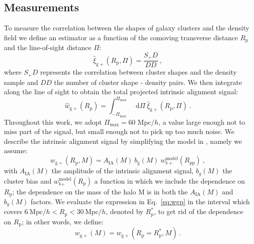 \documentclass[a4paper,fleqn,usenatbib]{mnras}
\newcommand*\dif{\mathop{}\!\mathrm{d}} 	%
\begin{document}
\subsection{Measurements}
\label{subsec:measurements}
To measure the correlation between the shapes of galaxy clusters and the density field we define an estimator as a function of the comoving transverse distance $R_{\mathrm{p}}$ and the line-of-sight distance $\Pi$:
\begin{equation}
    \hat{\xi}_{\mathrm{g+}}(R_{\mathrm{p}}, \Pi) = \frac{S_+ D}{D D} \ ,
	\label{eq:xigphat}
\end{equation}
where $S_+ D$ represents the correlation between cluster shapes and the density sample and $D D$ the number of cluster shape - density pairs. We then integrate along the line of sight to obtain the total projected intrinsic alignment signal:
\begin{equation}
   \hat{w}_{\mathrm{g+}} (R_{\mathrm{p}}) = \int _{-\Pi_{\mathrm{max}}}^{\Pi_{\mathrm{max}}} \dif \Pi \ \hat{\xi}_{\mathrm{g+}}(R_{\mathrm{p}}, \Pi) \ .
	\label{eq:wgphat}
\end{equation}
Throughout this work, we adopt $\Pi_{\mathrm{max}} = 60 $ Mpc$/h$, a value large enough not to miss part of the signal, but small enough not to pick up too much noise. 
We describe the intrinsic alignment signal by simplifying the model in \citet[equation 5]{vanUitertJoachimi2017}, namely we assume:
\begin{equation}
    w_{\mathrm{g+}} (R_{\mathrm{p}}, M)=A_{\mathrm{IA}} (M) \ b_{\mathrm{g}} (M)\ w_{\mathrm{\delta +}}^{\mathrm{model}} (R_{p \mathrm{p}}) \ , 
	\label{eq:wgp}
\end{equation}
with $A_{\mathrm{IA}} (M)$ the amplitude of the intrinsic alignment signal, $b_g (M)$ the cluster bias and $w_{\mathrm{\delta} \mathrm{+}}^{\mathrm{model}} (R_{\mathrm{p}})$ a function in which we include the dependence on $R_{\mathrm{p}}$; the dependence on the mass of the halo M is in both the $A_{\mathrm{IA}} (M)$ and $b_g (M)$ factors. We evaluate the expression in Eq.~\ref{eq:wgp} in the interval which covers $6 \ \mbox{Mpc}/h < R_{\mathrm{p}} < 30 \ \mbox{Mpc}/h$, denoted by $R_{\mathrm{p}}^*$, to get rid of the dependence on $R_{\mathrm{p}}$; in other words, we define:
\begin{equation}
    w_{\mathrm{g+}} (M)= w_{\mathrm{g+}} (R_{\mathrm{p}} = R_{\mathrm{p}}^*, M) \ .
	\label{eq:wgpmass}
\end{equation}
\end{document}
